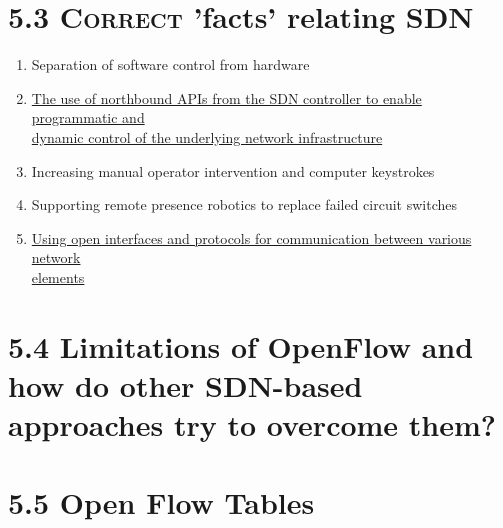 \documentclass{article}
\begin{document}
	\section*{5.3 \textsc{Correct} 'facts' relating SDN}
	\begin{adjustwidth}{2em}{2em}
		\begin{enumerate}[-]
			\item Separation of software control from hardware
			\item \underline{The use of northbound APIs from the SDN controller to enable programmatic and} \\ \underline{dynamic control of the underlying network infrastructure}
			\item Increasing manual operator intervention and computer keystrokes
			\item Supporting remote presence robotics to replace failed circuit switches
			\item \underline{Using open interfaces and protocols for communication between various network} \\ \underline{elements}
		\end{enumerate}
	\end{adjustwidth}
	
	\section*{5.4 Limitations of OpenFlow and how do other SDN-based approaches try to overcome them?}
	\begin{adjustwidth}{2em}{2em}
	\end{adjustwidth}
	
	\section*{5.5 Open Flow Tables}
	\begin{adjustwidth}{2em}{2em}
	\end{adjustwidth}
\end{document}
